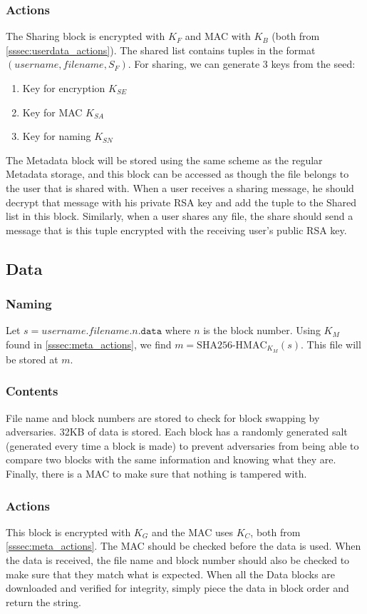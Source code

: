 \documentclass{article}
\begin{document}
\subsubsection{Actions}
The Sharing block is encrypted with $K_F$
and MAC with $K_B$ (both from \ref{sssec:userdata_actions}).
The shared list contains tuples in the format $(username, filename, S_F)$.
For sharing, we can generate 3 keys from the seed:
\begin{enumerate}
\item Key for encryption $K_{SE}$
\item Key for MAC $K_{SA}$
\item Key for naming $K_{SN}$
\end{enumerate}
The Metadata block will be stored using the same scheme as the regular Metadata storage, and this block
can be accessed as though the file belongs to the user that is shared with.
When a user receives a sharing message, he should decrypt that message with his private RSA key and add
the tuple to the Shared list in this block.
Similarly, when a user shares any file, the share should send a message that is this tuple encrypted with the
receiving user's public RSA key.

\subsection{Data}
\subsubsection{Naming}
Let $s = username\texttt{.}filename\texttt{.}n\texttt{.data}$ where $n$ is the block number.
Using $K_M$ found in \ref{sssec:meta_actions}, we find $m = \text{SHA256-HMAC}_{K_M}(s)$.
This file will be stored at $m$.

\subsubsection{Contents}
File name and block numbers are stored to check for block swapping by adversaries.
32KB of data is stored.
Each block has a randomly generated salt (generated every time a block is made) to prevent adversaries from
being able to compare two blocks with the same information and knowing what they are.
Finally, there is a MAC to make sure that nothing is tampered with.

\subsubsection{Actions}
This block is encrypted with $K_G$ and the MAC uses $K_C$, both from \ref{sssec:meta_actions}.
The MAC should be checked before the data is used.
When the data is received, the file name and block number should also be checked to make sure that they
match what is expected.
When all the Data blocks are downloaded and verified for integrity, simply piece the data in block order
and return the string.
\end{document}
